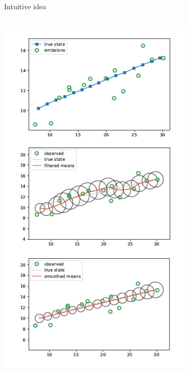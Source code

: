 \documentclass[11pt]{beamer}
\begin{document}
\begin{frame}{Intuitive idea \cite{pml2Book}}
\begin{columns}
\begin{column}{0.5\textwidth}
\begin{center}
     \includegraphics[width=0.7\textwidth]{Pic/Kalman_rec.png}
     \end{center}
\end{column}
\end{columns}
\end{frame}
\end{document}

